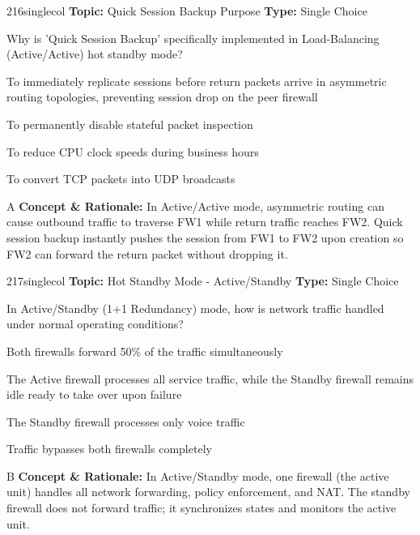 \begin{qcard}{216}{singlecol}
\textcolor{darkslate!75}{\small\textbf{Topic:} Quick Session Backup Purpose \hfill \textbf{Type:} Single Choice}\vspace{0.4em}\par
Why is 'Quick Session Backup' specifically implemented in Load-Balancing (Active/Active) hot standby mode?
\begin{qoptions}
\item To immediately replicate sessions before return packets arrive in asymmetric routing topologies, preventing session drop on the peer firewall
\item To permanently disable stateful packet inspection
\item To reduce CPU clock speeds during business hours
\item To convert TCP packets into UDP broadcasts
\end{qoptions}
\end{qcard}
\nopagebreak
\begin{explainbox}{A}
\textbf{Concept \& Rationale:} In Active/Active mode, asymmetric routing can cause outbound traffic to traverse FW1 while return traffic reaches FW2. Quick session backup instantly pushes the session from FW1 to FW2 upon creation so FW2 can forward the return packet without dropping it.
\end{explainbox}

\begin{qcard}{217}{singlecol}
\textcolor{darkslate!75}{\small\textbf{Topic:} Hot Standby Mode - Active/Standby \hfill \textbf{Type:} Single Choice}\vspace{0.4em}\par
In Active/Standby (1+1 Redundancy) mode, how is network traffic handled under normal operating conditions?
\begin{qoptions}
\item Both firewalls forward 50\% of the traffic simultaneously
\item The Active firewall processes all service traffic, while the Standby firewall remains idle ready to take over upon failure
\item The Standby firewall processes only voice traffic
\item Traffic bypasses both firewalls completely
\end{qoptions}
\end{qcard}
\nopagebreak
\begin{explainbox}{B}
\textbf{Concept \& Rationale:} In Active/Standby mode, one firewall (the active unit) handles all network forwarding, policy enforcement, and NAT. The standby firewall does not forward traffic; it synchronizes states and monitors the active unit.
\end{explainbox}

